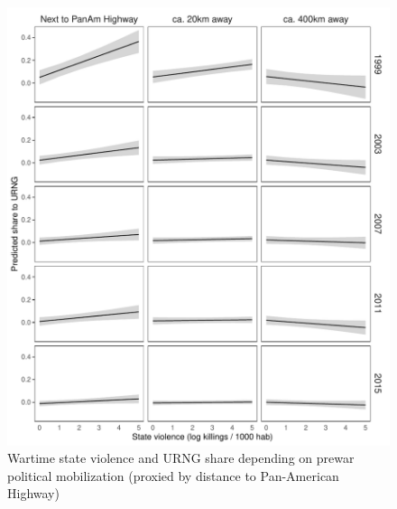 \documentclass[a4paper, 12pt, notitlepage]{article}
\begin{document}
\begin{figure}[htb!]
  \centering
    \includegraphics[width = \textwidth]{img/pp_URNG_panam_year}

  \caption{Wartime state violence and URNG share depending on prewar political mobilization (proxied by distance to Pan-American Highway)} \label{fig:pp_URNG_panam_yrs}

\end{figure}
\end{document}
